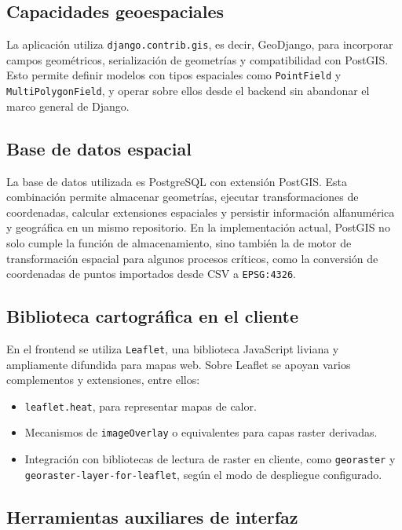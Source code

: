 \documentclass[12pt,a4paper]{report}
\begin{document}
\subsection{Capacidades geoespaciales}

La aplicaci\'on utiliza \texttt{django.contrib.gis}, es decir, GeoDjango, para incorporar campos geom\'etricos, serializaci\'on de geometr\'ias y compatibilidad con PostGIS. Esto permite definir modelos con tipos espaciales como \texttt{PointField} y \texttt{MultiPolygonField}, y operar sobre ellos desde el backend sin abandonar el marco general de Django.

\subsection{Base de datos espacial}

La base de datos utilizada es PostgreSQL con extensi\'on PostGIS. Esta combinaci\'on permite almacenar geometr\'ias, ejecutar transformaciones de coordenadas, calcular extensiones espaciales y persistir informaci\'on alfanum\'erica y geogr\'afica en un mismo repositorio. En la implementaci\'on actual, PostGIS no solo cumple la funci\'on de almacenamiento, sino tambi\'en la de motor de transformaci\'on espacial para algunos procesos cr\'iticos, como la conversi\'on de coordenadas de puntos importados desde CSV a \texttt{EPSG:4326}.

\subsection{Biblioteca cartogr\'afica en el cliente}

En el frontend se utiliza \texttt{Leaflet}, una biblioteca JavaScript liviana y ampliamente difundida para mapas web. Sobre Leaflet se apoyan varios complementos y extensiones, entre ellos:

\begin{itemize}
    \item \texttt{leaflet.heat}, para representar mapas de calor.
    \item Mecanismos de \texttt{imageOverlay} o equivalentes para capas raster derivadas.
    \item Integraci\'on con bibliotecas de lectura de raster en cliente, como \texttt{georaster} y \texttt{georaster-layer-for-leaflet}, seg\'un el modo de despliegue configurado.
\end{itemize}

\subsection{Herramientas auxiliares de interfaz}
\end{document}
